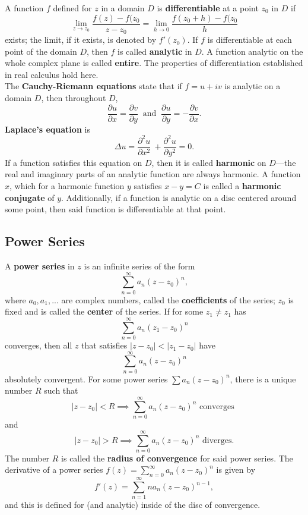 \documentclass[12pt,letterpaper]{article}
\begin{document}
A function \(f\) defined for \(z\) in a domain \(D\) is \textbf{differentiable} at a point \(z_{0}\) in \(D\) if \[\lim_{z \to z_{0}} \frac{f(z)-f(z_{0}}{z-z_{0}} = \lim_{h \to 0} \frac{f(z_{0}+h) - f(z_{0}}{h}\] exists; the limit, if it exists, is denoted by \(f'(z_{0})\). If \(f\) is differentiable at each point of the domain \(D\), then \(f\) is called \textbf{analytic} in \(D\). A function analytic on the whole complex plane is called \textbf{entire}. The properties of differentiation established in real calculus hold here. \\

The \textbf{Cauchy-Riemann equations} state that if \(f = u + iv\) is analytic on a domain \(D\), then throughout \(D\), \[\frac{\partial u}{\partial x} = \frac{\partial v}{\partial y}\ \text{ and }\ \frac{\partial u}{\partial y} = -\frac{\partial v}{\partial x}.\] \textbf{Laplace's equation} is \[\Delta u = \frac{\partial^{2} u}{\partial x^{2}}\ + \frac{\partial^{2} u}{\partial y^{2}} = 0.\] If a function satisfies this equation on \(D\), then it is called \textbf{harmonic} on \(D\)---the real and imaginary parts of an analytic function are always harmonic. A function \(x\), which for a harmonic function \(y\) satisfies \(x-y = C\) is called a \textbf{harmonic conjugate} of \(y\). Additionally, if a function is analytic on a disc centered around some point, then said function is differentiable at that point.

\subsection{Power Series}

A \textbf{power series} in \(z\) is an infinite series of the form \[\sum_{n=0}^{\infty} a_{n}(z-z_{0})^{n},\] where \(a_{0}, a_{1},...\) are complex numbers, called the \textbf{coefficients} of the series; \(z_{0}\) is fixed and is called the \textbf{center} of the series. If for some \(z_{1} \neq z_{1}\) has \[\sum_{n=0}^{\infty} a_{n}(z_{1}-z_{0})^{n}\] converges,  then all \(z\) that satisfies \(|z-z_{0}| < |z_{1}-z_{0}|\) have \[\sum_{n=0}^{\infty} a_{n}(z-z_{0})^{n}\] absolutely convergent. For some power series \(\sum a_{n}(z-z_{0})^{n}\), there is a unique number \(R\) such that \[|z-z_{0}| < R \implies \sum_{n=0}^{\infty} a_{n}(z-z_{0})^{n} \text{ converges }\] and \[|z-z_{0}| > R \implies \sum_{n=0}^{\infty} a_{n}(z-z_{0})^{n} \text{ diverges.}\] The number \(R\) is called the \textbf{radius of convergence} for said power series. The derivative of a power series \(f(z) = \sum_{n=0}^{\infty} a_{n}(z-z_{0})^{n}\) is given by \[f'(z) = \sum_{n=1}^{\infty} na_{n}(z-z_{0})^{n-1},\] and this is defined for  (and analytic) inside of the disc of convergence. 
\end{document}
